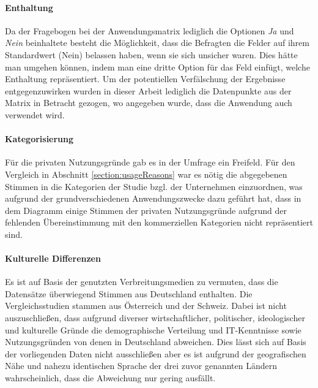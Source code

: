 \documentclass[a4paper]{article}
\begin{document}
            \paragraph{Enthaltung} %
                Da der Fragebogen bei der Anwendungsmatrix lediglich die Optionen \emph{Ja} und \emph{Nein} beinhaltete besteht die Möglichkeit, dass die Befragten die Felder auf ihrem Standardwert ({\scriptsize Nein}) belassen haben, wenn sie sich unsicher waren. Dies hätte man umgehen können, indem man eine dritte Option für das Feld einfügt, welche Enthaltung repräsentiert. Um der potentiellen Verfälschung der Ergebnisse entgegenzuwirken wurden in dieser Arbeit lediglich die Datenpunkte aus der Matrix in Betracht gezogen, wo angegeben wurde, dass die Anwendung auch verwendet wird.
                
            \paragraph{Kategorisierung}
                Für die privaten Nutzungsgründe gab es in der Umfrage ein Freifeld. Für den Vergleich in Abschnitt \ref{section:usageReasons} war es nötig die abgegebenen Stimmen in die Kategorien der Studie bzgl. der Unternehmen einzuordnen, was aufgrund der grundverschiedenen Anwendungszwecke dazu geführt hat, dass in dem Diagramm einige Stimmen der privaten Nutzungsgründe aufgrund der fehlenden Übereinstimmung mit den kommerziellen Kategorien nicht repräsentiert sind.
                
            \paragraph{Kulturelle Differenzen}
                Es ist auf Basis der genutzten Verbreitungsmedien zu vermuten, dass die Datensätze überwiegend Stimmen aus Deutschland enthalten. Die Vergleichsstudien stammen aus Österreich und der Schweiz. Dabei ist nicht auszuschließen, dass aufgrund diverser wirtschaftlicher, politischer, ideologischer und kulturelle Gründe die demographische Verteilung und IT-Kenntnisse sowie Nutzungsgründen von denen in Deutschland abweichen. Dies lässt sich auf Basis der vorliegenden Daten nicht ausschließen aber es ist aufgrund der geografischen Nähe und nahezu identischen Sprache der drei zuvor genannten Ländern wahrscheinlich, dass die Abweichung nur gering ausfällt.
                
\end{document}
